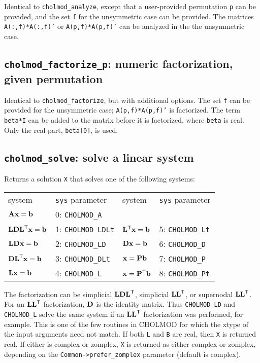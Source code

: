 \documentclass[11pt]{article}
\newcommand{\m}[1]{{\bf{#1}}}       %
\newcommand{\tr}{^{\sf T}}          %
\begin{document}

Identical to {\tt cholmod\_analyze}, except that a user-provided permutation
{\tt p} can be provided, and the set {\tt f} for the unsymmetric case can be
provided.  The matrices {\tt A(:,f)*A(:,f)'} or {\tt A(p,f)*A(p,f)'} can be
analyzed in the the unsymmetric case.

\subsection{{\tt cholmod\_factorize\_p}: numeric factorization, given
permutation}


Identical to {\tt cholmod\_factorize}, but with additional options.  The set
{\tt f} can be provided for the unsymmetric case; {\tt A(p,f)*A(p,f)'} is
factorized.  The term {\tt beta*I} can be added to the matrix before it is
factorized, where {\tt beta} is real.  Only the real part, {\tt beta[0]}, is
used.

\subsection{{\tt cholmod\_solve}: solve a linear system}


Returns a solution {\tt X} that solves one of the following systems:

\begin{tabular}{ll|ll}
\hline
system                  & {\tt sys} parameter    & system                & {\tt sys} parameter  \\
$\m{Ax}=\m{b}$          & 0: {\tt CHOLMOD\_A}    &                       &                      \\
$\m{LDL}\tr\m{x}=\m{b}$ & 1: {\tt CHOLMOD\_LDLt} & $\m{L}\tr\m{x}=\m{b}$ & 5: {\tt CHOLMOD\_Lt} \\
$\m{LDx}=\m{b}$         & 2: {\tt CHOLMOD\_LD}   & $\m{Dx}=\m{b}$        & 6: {\tt CHOLMOD\_D}  \\
$\m{DL}\tr\m{x}=\m{b}$  & 3: {\tt CHOLMOD\_DLt}  & $\m{x}=\m{Pb}$        & 7: {\tt CHOLMOD\_P}  \\
$\m{Lx}=\m{b}$          & 4: {\tt CHOLMOD\_L}    & $\m{x}=\m{P}\tr\m{b}$ & 8: {\tt CHOLMOD\_Pt} \\
\hline
\end{tabular}

The factorization can be simplicial $\m{LDL}\tr$, simplicial $\m{LL}\tr$, or
supernodal $\m{LL}\tr$.  For an $\m{LL}\tr$ factorization, $\m{D}$ is the
identity matrix.  Thus {\tt CHOLMOD\_LD} and {\tt CHOLMOD\_L} solve the same
system if an $\m{LL}\tr$ factorization was performed, for example.  This is one
of the few routines in CHOLMOD for which the xtype of the input arguments need
not match.  If both {\tt L} and {\tt B} are real, then {\tt X} is returned
real.  If either is complex or zomplex, {\tt X} is returned as either complex
or zomplex, depending on the {\tt Common->prefer\_zomplex} parameter (default
is complex).
\end{document}
